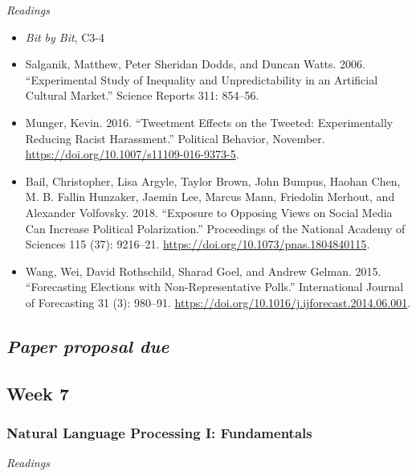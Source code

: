 \documentclass[
  10pt,
]{article}
\providecommand{\tightlist}{%
  \setlength{\itemsep}{0pt}\setlength{\parskip}{0pt}}
\begin{document}
\emph{Readings}

\begin{itemize}
\tightlist
\item
  \emph{Bit by Bit}, C3-4
\item
  Salganik, Matthew, Peter Sheridan Dodds, and Duncan Watts. 2006.
  ``Experimental Study of Inequality and Unpredictability in an
  Artificial Cultural Market.'' Science Reports 311: 854--56.
\item
  Munger, Kevin. 2016. ``Tweetment Effects on the Tweeted:
  Experimentally Reducing Racist Harassment.'' Political Behavior,
  November. \url{https://doi.org/10.1007/s11109-016-9373-5}.
\item
  Bail, Christopher, Lisa Argyle, Taylor Brown, John Bumpus, Haohan
  Chen, M. B. Fallin Hunzaker, Jaemin Lee, Marcus Mann, Friedolin
  Merhout, and Alexander Volfovsky. 2018. ``Exposure to Opposing Views
  on Social Media Can Increase Political Polarization.'' Proceedings of
  the National Academy of Sciences 115 (37): 9216--21.
  \url{https://doi.org/10.1073/pnas.1804840115}.
\item
  Wang, Wei, David Rothschild, Sharad Goel, and Andrew Gelman. 2015.
  ``Forecasting Elections with Non-Representative Polls.'' International
  Journal of Forecasting 31 (3): 980--91.
  \url{https://doi.org/10.1016/j.ijforecast.2014.06.001}.
\end{itemize}

\hypertarget{paper-proposal-due}{%
\subsection{\texorpdfstring{\emph{Paper proposal
due}}{Paper proposal due}}\label{paper-proposal-due}}

\hypertarget{week-7}{%
\subsection{Week 7}\label{week-7}}

\hypertarget{natural-language-processing-i-fundamentals}{%
\subsubsection{Natural Language Processing I:
Fundamentals}\label{natural-language-processing-i-fundamentals}}

\emph{Readings}
\end{document}

